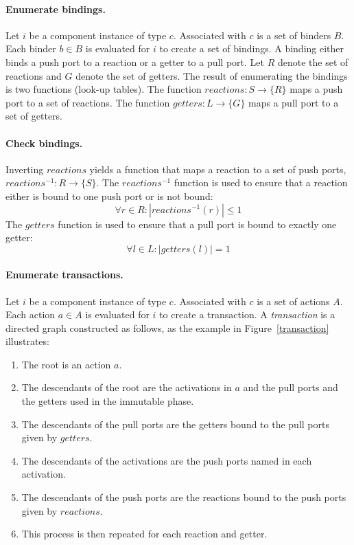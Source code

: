 \paragraph{Enumerate bindings.}
Let $i$ be a component instance of type $c$.
Associated with $c$ is a set of binders $B$.
Each binder $b \in B$ is evaluated for $i$ to create a set of bindings.
A binding either binds a push port to a reaction or a getter to a pull port.
Let $R$ denote the set of reactions and $G$ denote the set of getters.
The result of enumerating the bindings is two functions (look-up tables).
The function $\mathit{reactions}: S \to \{ R \}$ maps a push port to a set of reactions.
The function $\mathit{getters}: L \to \{ G \}$ maps a pull port to a set of getters.

\paragraph{Check bindings.}
Inverting $\mathit{reactions}$ yields a function that maps a reaction to a set of push ports, $\mathit{reactions}^{-1}: R \to \{ S \}$.
The $\mathit{reactions}^{-1}$ function is used to ensure that a reaction either is bound to one push port or is not bound:
\begin{equation}
\forall r \in R : |\mathit{reactions}^{-1} (r)| \leq 1
\end{equation}
The $\mathit{getters}$ function is used to ensure that a pull port is bound to exactly one getter:
\begin{equation}
\forall l \in L : |\mathit{getters} (l)| = 1
\end{equation}

\paragraph{Enumerate transactions.}
Let $i$ be a component instance of type $c$.
Associated with $c$ is a set of actions $A$.
Each action $a \in A$ is evaluated for $i$ to create a transaction.
A \emph{transaction} is a directed graph constructed as follows, as the example in Figure~\ref{transaction} illustrates:
\begin{enumerate}
\item The root is an action $a$.
\item The descendants of the root are the activations in $a$ and the pull ports and the getters used in the immutable phase.
\item The descendants of the pull ports are the getters bound to the pull ports given by $\mathit{getters}$.
\item The descendants of the activations are the push ports named in each activation.
\item The descendants of the push ports are the reactions bound to the push ports given by $\mathit{reactions}$.
\item This process is then repeated for each reaction and getter.
\end{enumerate}

